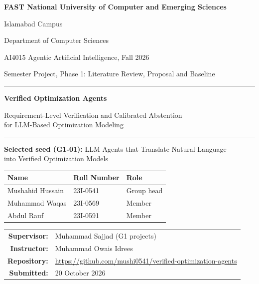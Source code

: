\documentclass[11pt,a4paper]{article}
\begin{document}
\hypersetup{pageanchor=false}
\begin{titlepage}
\centering
\vspace*{0.6cm}
{\large\bfseries FAST National University of Computer and Emerging Sciences\par}
\vspace{1mm}
{\normalsize Islamabad Campus\par}
\vspace{1mm}
{\normalsize Department of Computer Sciences\par}
\vspace{10mm}
{\large AI4015 Agentic Artificial Intelligence, Fall 2026\par}
\vspace{1mm}
{\normalsize Semester Project, Phase 1: Literature Review, Proposal and Baseline\par}
\vspace{14mm}
\rule{\textwidth}{0.8pt}\par
\vspace{5mm}
{\LARGE\bfseries Verified Optimization Agents\par}
\vspace{3mm}
{\Large Requirement-Level Verification and Calibrated Abstention\\[1mm]for LLM-Based Optimization Modeling\par}
\vspace{5mm}
\rule{\textwidth}{0.8pt}\par
\vspace{8mm}
{\normalsize\textbf{Selected seed (G1-01):} LLM Agents that Translate Natural Language\\into Verified Optimization Models\par}
\vspace{14mm}
\begin{tabular}{l l l}
\toprule
\textbf{Name} & \textbf{Roll Number} & \textbf{Role}\\
\midrule
Mushahid Hussain & 23I-0541 & Group head\\
Muhammad Waqas & 23I-0569 & Member\\
Abdul Rauf & 23I-0591 & Member\\
\bottomrule
\end{tabular}\par
\vspace{14mm}
\begin{tabular}{r l}
\textbf{Supervisor:} & Muhammad Sajjad (G1 projects)\\
\textbf{Instructor:} & Muhammad Owais Idrees\\
\textbf{Repository:} & \url{https://github.com/mushi0541/verified-optimization-agents}\\
\textbf{Submitted:} & 20 October 2026\\
\end{tabular}
\vfill
\end{titlepage}
\hypersetup{pageanchor=true}
\end{document}
